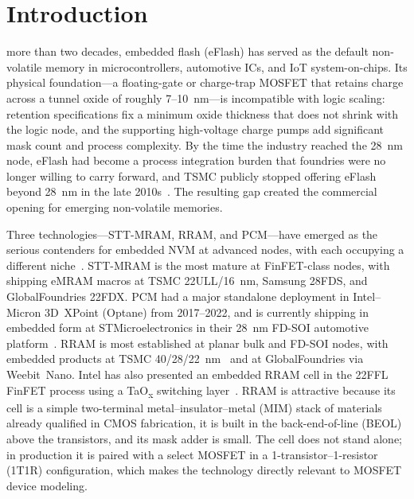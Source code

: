 \documentclass[lettersize,journal]{IEEEtran}
\begin{document}
\section{Introduction}
 more than two decades, embedded flash (eFlash) has served as the default non-volatile memory in microcontrollers, automotive ICs, and IoT system-on-chips. Its physical foundation---a floating-gate or charge-trap MOSFET that retains charge across a tunnel oxide of roughly 7--10~nm---is incompatible with logic scaling: retention specifications fix a minimum oxide thickness that does not shrink with the logic node, and the supporting high-voltage charge pumps add significant mask count and process complexity. By the time the industry reached the 28~nm node, eFlash had become a process integration burden that foundries were no longer willing to carry forward, and TSMC publicly stopped offering eFlash beyond 28~nm in the late 2010s~\cite{ref_hellenbrand2024}. The resulting gap created the commercial opening for emerging non-volatile memories.

Three technologies---STT-MRAM, RRAM, and PCM---have emerged as the serious contenders for embedded NVM at advanced nodes, with each occupying a different niche~\cite{ref_hellenbrand2024}. STT-MRAM is the most mature at FinFET-class nodes, with shipping eMRAM macros at TSMC 22ULL/16~nm, Samsung 28FDS, and GlobalFoundries 22FDX. PCM had a major standalone deployment in Intel--Micron 3D~XPoint (Optane) from 2017--2022, and is currently shipping in embedded form at STMicroelectronics in their 28~nm FD-SOI automotive platform~\cite{ref_hellenbrand2024}. RRAM is most established at planar bulk and FD-SOI nodes, with embedded products at TSMC 40/28/22~nm~\cite{ref_chou2018} and at GlobalFoundries via Weebit~Nano. Intel has also presented an embedded RRAM cell in the 22FFL FinFET process using a TaO\textsubscript{x} switching layer~\cite{ref_golonzka2019}. RRAM is attractive because its cell is a simple two-terminal metal--insulator--metal (MIM) stack of materials already qualified in CMOS fabrication, it is built in the back-end-of-line (BEOL) above the transistors, and its mask adder is small. The cell does not stand alone; in production it is paired with a select MOSFET in a 1-transistor--1-resistor (1T1R) configuration, which makes the technology directly relevant to MOSFET device modeling.
\end{document}
